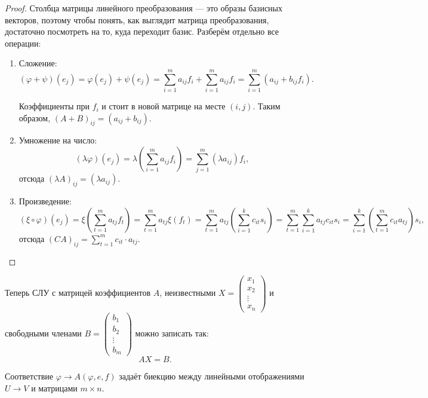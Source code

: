 \begin{proof}
    Столбца матрицы линейного преобразования --- это образы базисных векторов, поэтому чтобы понять, как выглядит матрица преобразования, достаточно посмотреть на то, куда переходит базис. Разберём отдельно все операции:
    \begin{enumerate}
        \item Сложение:
            $$
            (\varphi + \psi)(e_j) = \varphi(e_j) + \psi(e_j) = \sum_{i = 1}^m a_{ij}f_i + \sum_{i = 1}^m a_{ij}f_i = \sum_{i = 1}^m(a_{ij} + b_{ij}f_i).
            $$

            Коэффициенты при $f_i$ и стоит в новой матрице на месте $(i, j)$. Таким образом, $(A + B)_{ij} = (a_{ij} + b_{ij})$.

        \item Умножение на число:
            $$
            (\lambda\varphi)(e_j) = \lambda\left(\sum_{i = 1}^m a_{ij}f_i\right) = \sum_{j = 1}^m(\lambda a_{ij})f_i,
            $$
            отсюда $(\lambda A)_{ij} = (\lambda a_{ij})$.

        \item Произведение:
            $$
            (\xi \circ \varphi)(e_j) = \xi\left(\sum_{t = 1}^ma_{tj}f_t\right) = \sum_{t = 1}^ma_{tj}\xi(f_t) = \sum_{t = 1}^ma_{tj}\left(\sum_{i = 1}^k c_{it}s_i\right) = \sum_{t = 1}^m\sum_{i = 1}^ka_{tj}c_{it}s_i = \sum_{i = 1}^k\left(\sum_{t = 1}^m c_{it}a_{tj}\right)s_i,
            $$
            отсюда $\displaystyle (CA)_{ij} = \sum_{t = 1}^m c_{it}\cdot a_{tj}$.
    \end{enumerate}
\end{proof}

Теперь СЛУ с матрицей коэффициентов $A$, неизвестными
$X = 
\begin{pmatrix}
    x_1\\
    x_2\\
    \vdots\\
    x_n
\end{pmatrix}
$ и свободными членами
$
B = 
\begin{pmatrix}
    b_1\\
    b_2\\
    \vdots\\ 
    b_m
\end{pmatrix}
$ можно записать так:
$$ AX = B. $$

\begin{theorem}
    Соответствие $\varphi \rightarrow A(\varphi, e, f)$ задаёт биекцию между линейными отображениями $U \rightarrow V$ и матрицами $m \times n$.
\end{theorem}

